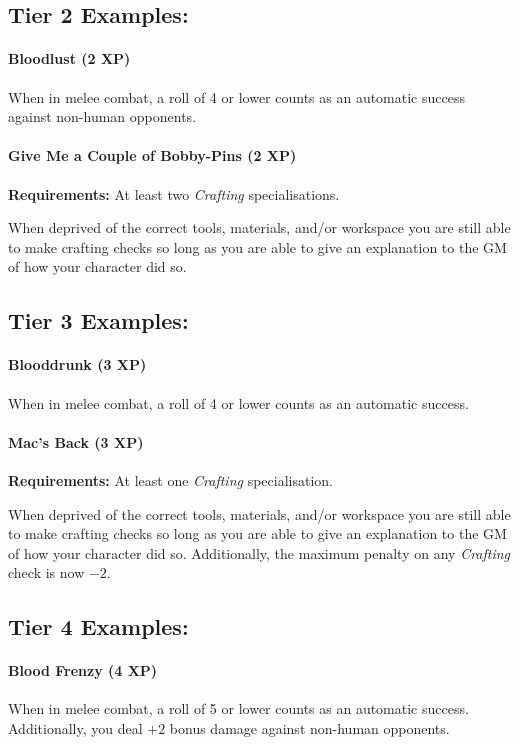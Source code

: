 \subsection{Tier 2 Examples:}
\paragraph{Bloodlust (2 XP)}
When in melee combat, a roll of 4 or lower counts as an automatic success against non-human opponents.

\paragraph{Give Me a Couple of Bobby-Pins (2 XP)}
\textbf{Requirements:} At least two \textit{Crafting} specialisations.

When deprived of the correct tools, materials, and/or workspace you are still able to make crafting checks so long as you are able to give an explanation to the GM of how your character did so.

\subsection{Tier 3 Examples:}
\paragraph{Blooddrunk (3 XP)}
When in melee combat, a roll of 4 or lower counts as an automatic success.

\paragraph{Mac's Back (3 XP)}
\textbf{Requirements:} At least one \textit{Crafting} specialisation.

When deprived of the correct tools, materials, and/or workspace you are still able to make crafting checks so long as you are able to give an explanation to the GM of how your character did so.
Additionally, the maximum penalty on any \textit{Crafting} check is now $-2$.

\subsection{Tier 4 Examples:}

\paragraph{Blood Frenzy (4 XP)}
When in melee combat, a roll of 5 or lower counts as an automatic success.
Additionally, you deal $+2$ bonus damage against non-human opponents.

